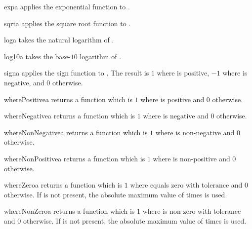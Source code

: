 \begin{funcdesc}{exp}{a}
applies the exponential function to .
\end{funcdesc}

\begin{funcdesc}{sqrt}{a}
applies the square root function to .
\end{funcdesc}

\begin{funcdesc}{log}{a}
takes the natural logarithm of .
\end{funcdesc}

\begin{funcdesc}{log10}{a}
takes the base-$10$ logarithm of .
\end{funcdesc}

\begin{funcdesc}{sign}{a}
applies the sign function to . The result is $1$ where  is
positive, $-1$ where  is negative, and $0$ otherwise.
\end{funcdesc}

\begin{funcdesc}{wherePositive}{a}
returns a function which is $1$ where  is positive and $0$ otherwise.
\end{funcdesc}

\begin{funcdesc}{whereNegative}{a}
returns a function which is $1$ where  is negative and $0$ otherwise.
\end{funcdesc}

\begin{funcdesc}{whereNonNegative}{a}
returns a function which is $1$ where  is non-negative and $0$ otherwise.
\end{funcdesc}

\begin{funcdesc}{whereNonPositive}{a}
returns a function which is $1$ where  is non-positive and $0$ otherwise.
\end{funcdesc}

\begin{funcdesc}{whereZero}{a}
returns a function which is $1$ where  equals zero with tolerance
 and $0$ otherwise. If  is not present, the absolute maximum
value of  times  is used.
\end{funcdesc}

\begin{funcdesc}{whereNonZero}{a}
returns a function which is $1$ where  is non-zero with tolerance
 and $0$ otherwise. If  is not present, the absolute maximum
value of  times  is used.
\end{funcdesc}

